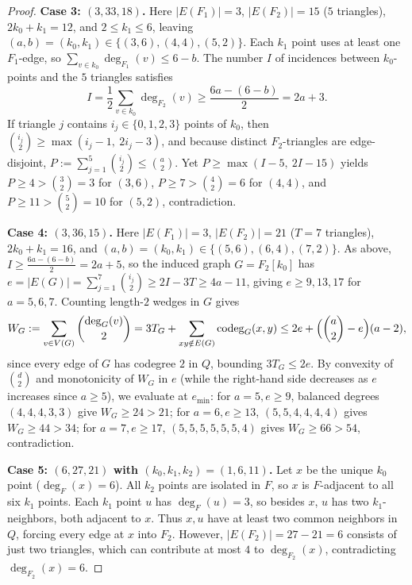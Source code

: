 \documentclass[11pt]{amsart}
\theoremstyle{definition}
\theoremstyle{remark}
\begin{document}
\begin{proof}
\smallskip\noindent\textbf{Case 3: $(3,33,18)$.} Here $|E(F_1)| = 3$, $|E(F_2)| = 15$ ($5$ triangles), $2k_0 + k_1 = 12$, and $2 \le k_1 \le 6$, leaving $(a,b) = (k_0,k_1) \in \{(3,6), (4,4), (5,2)\}$. Each $k_1$ point uses at least one $F_1$-edge, so $\sum_{v \in k_0} \deg_{F_1}(v) \le 6 - b$. The number $I$ of incidences between $k_0$-points and the $5$ triangles satisfies
\[
I = \frac{1}{2}\sum_{v \in k_0} \deg_{F_2}(v) \ge \frac{6a - (6-b)}{2} = 2a + 3.
\]
If triangle $j$ contains $i_j \in \{0,1,2,3\}$ points of $k_0$, then $\binom{i_j}{2} \ge \max(i_j - 1,\ 2i_j - 3)$, and because distinct $F_2$-triangles are edge-disjoint, $P := \sum_{j=1}^5 \binom{i_j}{2} \le \binom{a}{2}$. Yet $P \ge \max(I - 5,\ 2I - 15)$ yields $P \ge 4 > \binom{3}{2} = 3$ for $(3,6)$, $P \ge 7 > \binom{4}{2} = 6$ for $(4,4)$, and $P \ge 11 > \binom{5}{2} = 10$ for $(5,2)$, contradiction.

\smallskip\noindent\textbf{Case 4: $(3,36,15)$.} Here $|E(F_1)| = 3$, $|E(F_2)| = 21$ ($T=7$ triangles), $2k_0 + k_1 = 16$, and $(a,b) = (k_0, k_1) \in \{(5,6), (6,4), (7,2)\}$. As above, $I \ge \frac{6a - (6-b)}{2} = 2a + 5$, so the induced graph $G = F_2[k_0]$ has $e = |E(G)| = \sum_{j=1}^7 \binom{i_j}{2} \ge 2I - 3T \ge 4a - 11$, giving $e \ge 9, 13, 17$ for $a = 5, 6, 7$. Counting length-$2$ wedges in $G$ gives
\[
W_G := \sum_{v \in V(G)} \binom{\deg_G(v)}{2} = 3T_G + \sum_{xy \notin E(G)} \operatorname{codeg}_G(x,y) \le 2e + \Bigl(\binom{a}{2} - e\Bigr)(a - 2),
\]
since every edge of $G$ has codegree $2$ in $Q$, bounding $3T_G \le 2e$. By convexity of $\binom{d}{2}$ and monotonicity of $W_G$ in $e$ (while the right-hand side decreases as $e$ increases since $a \ge 5$), we evaluate at $e_{\min}$: for $a=5, e \ge 9$, balanced degrees $(4,4,4,3,3)$ give $W_G \ge 24 > 21$; for $a=6, e \ge 13$, $(5,5,4,4,4,4)$ gives $W_G \ge 44 > 34$; for $a=7, e \ge 17$, $(5,5,5,5,5,5,4)$ gives $W_G \ge 66 > 54$, contradiction.

\smallskip\noindent\textbf{Case 5: $(6,27,21)$ with $(k_0, k_1, k_2) = (1, 6, 11)$.} Let $x$ be the unique $k_0$ point ($\deg_F(x) = 6$). All $k_2$ points are isolated in $F$, so $x$ is $F$-adjacent to all six $k_1$ points. Each $k_1$ point $u$ has $\deg_F(u) = 3$, so besides $x$, $u$ has two $k_1$-neighbors, both adjacent to $x$. Thus $x, u$ have at least two common neighbors in $Q$, forcing every edge at $x$ into $F_2$. However, $|E(F_2)| = 27 - 21 = 6$ consists of just two triangles, which can contribute at most $4$ to $\deg_{F_2}(x)$, contradicting $\deg_{F_2}(x) = 6$.
\end{proof}
\end{document}
